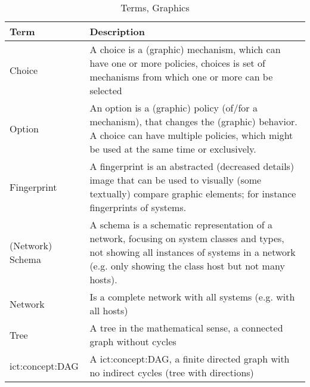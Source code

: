 \begin{table}[H]
    \caption{Terms, Graphics}
    \label{tab:terms:text}
    \centering
    \begin{tabular}{p{} p{}}
        \toprule
        \textbf{Term} & \textbf{Description}\\
        \toprule

        Choice &
        A choice is a (graphic) mechanism, which can have one or more policies, choices is set of mechanisms from which one or more can be selected
        \\

        Option &
        An option is a (graphic) policy (of/for a mechanism), that changes the (graphic) behavior.
        A choice can have multiple policies, which might be used at the same time or exclusively.
        \\

        Fingerprint &
        A fingerprint is an abstracted (decreased details) image that can be used to visually (some textually) compare graphic elements;
        for instance fingerprints of systems.
        \\

        (Network) Schema &
        A schema is a schematic representation of a network, focusing on system classes and types,
        not showing all instances of systems in a network (e.g. only showing the class host but not many hosts).
        \\

        Network &
        Is a complete network with all systems (e.g. with all hosts)
        \\

        Tree &
        A tree in the mathematical sense, a connected graph without cycles
        \\

        \acs{ict:concept:DAG} &
        A \acl{ict:concept:DAG}, a finite directed graph with no indirect cycles (tree with directions)
        \\

        \toprule
    \end{tabular}
\end{table}
